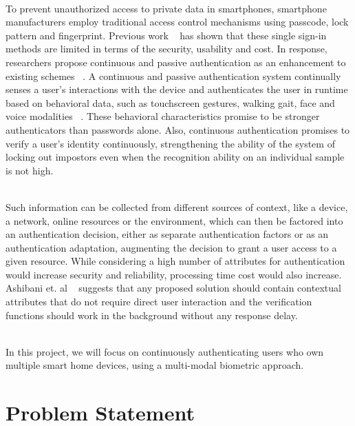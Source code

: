 \documentclass[a4paper, 11pt]{article}
\begin{document}
\noindent\\
To prevent unauthorized access to private data in smartphones, smartphone manufacturers employ traditional access control mechanisms using passcode, lock pattern and fingerprint. Previous work ~\cite{aviv2010smudge, chin2012measuring, de2012touch} has shown that these single sign-in methods are limited in terms of the security, usability and cost. In response, researchers propose continuous and passive authentication as an enhancement to existing schemes ~\cite{frank2013touchalytics,patel2016continuous}. A continuous and passive authentication system continually senses a user’s interactions with the device and authenticates the user in runtime based on behavioral data, such as touchscreen gestures, walking gait, face and voice modalities ~\cite{meng2015surveying,stylios2016review}. These behavioral characteristics promise to be stronger authenticators than passwords alone.  Also, continuous authentication promises to verify a user’s identity continuously, strengthening the ability of the system of locking out impostors even when the recognition ability on an individual sample is not high.

\noindent\\
Such information can be collected from different sources of context, like a device, a network, online resources or the environment, which can then be factored into an authentication decision, either as separate authentication factors or as an authentication adaptation, augmenting the decision to grant a user access to a given resource. While considering a high number of attributes for authentication would increase security and reliability, processing time cost would also increase.  Ashibani et. al ~\cite{ashibani2019design} suggests that any proposed solution should contain contextual attributes that do not require direct user interaction and the verification functions should work in the background without any response delay. 

\noindent\\
In this project, we will focus on continuously authenticating users who own multiple smart home devices, using a multi-modal biometric approach. 

\section*{Problem Statement}
\end{document}

